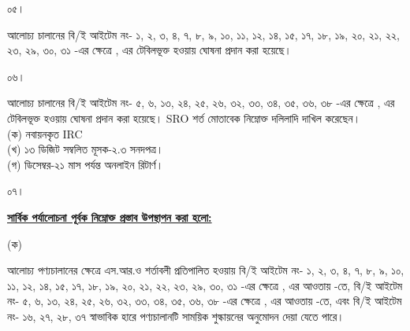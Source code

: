 \documentclass[12pt]{article}
\newcommand{\musokr}{ডিসেম্বর-২১}
\begin{document}
\normalsize
\noindent
\begin{minipage}[t]{0.05\linewidth}
০৫।
\end{minipage}
\begin{minipage}[t]{0.95\linewidth}
আলোচ্য চালানের
বি/ই আইটেম নং-
১, ২, ৩, ৪,
৭, ৮, ৯, ১০, ১১, ১২, ১৪,
১৫, ১৭, ১৮, ১৯, ২০, ২১, ২২, ২৩,
২৯, ৩০, ৩১
-এর ক্ষেত্রে
{\srootz}, {\srootzd}
এর টেবিলভূক্ত হওয়ায়
{\cpcofs}
ঘোষনা প্রদান করা হয়েছে।
\\
\end{minipage}
\begin{minipage}[t]{0.05\linewidth}
০৬।
\end{minipage}
\begin{minipage}[t]{0.95\linewidth}
আলোচ্য চালানের বি/ই আইটেম নং-
৫, ৬, ১৩, ২৪, ২৫, ২৬,
৩২, ৩৩, ৩৪, ৩৫, ৩৬, ৩৮
-এর ক্ষেত্রে
{\srooot}, {\sroootd}
এর টেবিলভূক্ত হওয়ায়
{\cpcttz}
ঘোষনা প্রদান করা হয়েছে।
SRO শর্ত মোতাবেক নিম্নোক্ত
দলিলাদি দাখিল করেছেন।
\\
(ক) নবায়নকৃত IRC
\\
(খ) ১৩ ডিজিট সম্বলিত মূসক-২.৩ সনদপত্র।
\\
(গ) {\musokr} মাস পর্যন্ত অনলাইন রিটার্ণ।
\\
\end{minipage}
\begin{minipage}[t]{0.05\linewidth}
০৭।
\end{minipage}
\begin{minipage}[t]{0.95\linewidth}
\underline{\textbf{সার্বিক পর্যালোচনা পূর্বক নিম্নোক্ত প্রস্তাব উপস্থাপন করা হলো:}}
\end{minipage}
\begin{minipage}[t]{0.05\linewidth}
\hspace{1em}
\end{minipage}
\begin{minipage}[t]{0.05\linewidth}
(ক)
\end{minipage}
\begin{minipage}[t]{0.90\linewidth}
আলোচ্য পণ্যচালানের ক্ষেত্রে এস.আর.ও শর্তাবলী প্রতিপালিত হওয়ায় বি/ই আইটেম নং-
১, ২, ৩, ৪,
৭, ৮, ৯, ১০, ১১, ১২, ১৪,
১৫, ১৭, ১৮, ১৯, ২০, ২১, ২২, ২৩,
২৯, ৩০, ৩১
-এর ক্ষেত্রে
{\srootz}, {\srootzd}
এর আওতায়
{\cpcofs}
-তে,
বি/ই আইটেম নং-
৫, ৬, ১৩, ২৪, ২৫, ২৬,
৩২, ৩৩, ৩৪, ৩৫, ৩৬, ৩৮
-এর ক্ষেত্রে
{\srooot}, {\sroootd}
এর আওতায়
{\cpcttz}
-তে,
এবং
বি/ই আইটেম নং-
১৬, ২৭, ২৮, ৩৭
স্বাভাবিক হারে
পণ্যচালানটি
সাময়িক
শুল্কায়নের অনুমোদন দেয়া
যেতে পারে।
\\
\end{minipage}
\begin{minipage}[t]{0.05\linewidth}
\hspace{1em}
\end{minipage}
\end{document}
